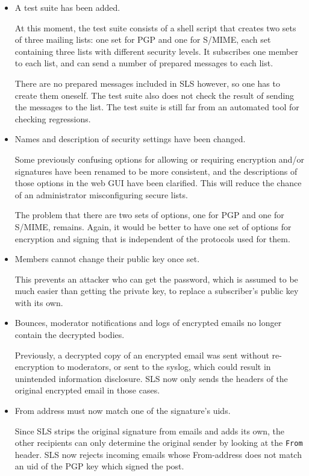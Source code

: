 \documentclass[a4]{article}
\newcommand{\hdr}[1]{\texttt{#1}}
\begin{document}
\begin{itemize}
\item A test suite has been added.

At this moment, the test suite consists of a shell script that creates two sets of three mailing lists:
one set for PGP and one for S/MIME, each set containing three lists with different security levels.
It subscribes one member to each list, and can send a number of prepared messages to each list.

There are no prepared messages included in SLS however, so one has to create them oneself.
The test suite also does not check the result of sending the messages to the list.
The test suite is still far from an automated tool for checking regressions.

\item Names and description of security settings have been changed.

Some previously confusing options for allowing or requiring encryption and/or signatures have been renamed
to be more consistent, and the descriptions of those options in the web GUI have been clarified.
This will reduce the chance of an administrator misconfiguring secure lists.

The problem that there are two sets of options, one for PGP and one for S/MIME,
remains.  Again, it would be better to have one set of options for encryption
and signing that is independent of the protocols used for them.

\item Members cannot change their public key once set.

This prevents an attacker who can get the password, which is assumed to be much easier than getting the private key,
to replace a subscriber's public key with its own.

\item Bounces, moderator notifications and logs of encrypted emails no longer contain the decrypted bodies.

Previously, a decrypted copy of an encrypted email was sent without re-encryption to moderators, or sent to the syslog,
which could result in unintended information disclosure.
SLS now only sends the headers of the original encrypted email in those cases.

\item From address must now match one of the signature's uids.

Since SLS strips the original signature from emails and adds its own,
the other recipients can only determine the original sender by looking at the \hdr{From} header.
SLS now rejects incoming emails whose From-address does not match an uid of the PGP key which signed the post.
\end{itemize}
\end{document}
